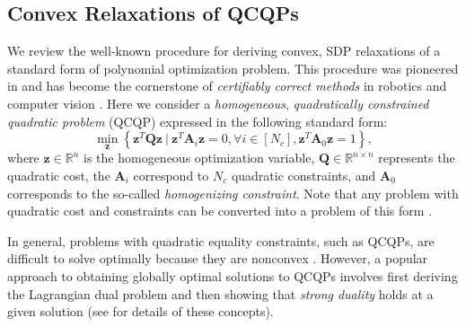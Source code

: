\documentclass[lettersize,journal]{IEEEtran}
\newcommand{\indset}[1]{\left[#1\right]}
\begin{document}
\subsection{Convex Relaxations of QCQPs}\label{sec:Relaxation}

We review the well-known procedure for deriving convex, SDP relaxations of a standard form of polynomial optimization problem. This procedure was pioneered in \cite{shorQuadraticOptimizationProblems1987} and has become the cornerstone of \textit{certifiably correct methods} in robotics and computer vision \cite{rosenAdvancesInferenceRepresentation2021,brynteTightnessSemidefiniteRelaxations2022}. Here we consider a \textit{homogeneous}, \textit{quadratically constrained quadratic problem} (QCQP) expressed in the following standard form:
\begin{equation}\label{opt:QCQP}
	\min\limits_{\bm{z}} \left\{ \bm{z}^T\bm{Q}\bm{z} ~\vert~ \bm{z}^T\bm{A}_i\bm{z} = 0,\forall i \in \indset{N_c}, \bm{z}^T\bm{A}_0\bm{z} = 1 \right\},
\end{equation}
where $ \bm{z}\in\mathbb{R}^n $ is the homogeneous optimization variable, $ \bm{Q}\in\mathbb{R}^{n\times n} $ represents the quadratic cost, the $ \bm{A}_i $ correspond to $ N_c $ quadratic constraints, and $ \bm{A}_0 $ corresponds to the so-called \emph{homogenizing constraint}\cite{cifuentesLocalStabilitySemidefinite2022}. Note that any problem with quadratic cost and constraints can be converted into a problem of this form \cite{cifuentesLocalStabilitySemidefinite2022}.

In general, problems with quadratic equality constraints, such as QCQPs, are difficult to solve optimally because they are nonconvex \cite{boydConvexOptimization2004}. However, a popular approach to obtaining globally optimal solutions to QCQPs involves first deriving the Lagrangian dual problem and then showing that \textit{strong duality} holds at a given solution (see \cite{boydConvexOptimization2004} for details of these concepts). 
\end{document}
